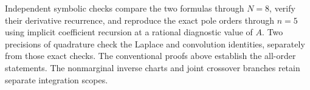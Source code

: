 Independent symbolic checks compare the two formulas through $N=8$,
verify their derivative recurrence, and reproduce the exact pole orders
through $n=5$ using implicit coefficient recursion at a rational
diagnostic value of $A$. Two precisions of quadrature check the Laplace
and convolution identities, separately from those exact checks.
The conventional proofs above establish the all-order statements.
The nonmarginal inverse charts and joint crossover branches retain
separate integration scopes.
